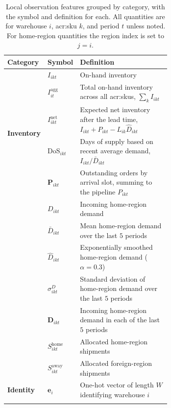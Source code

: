 \begin{table}[tbp]
\centering
\small
\setlength{\tabcolsep}{6pt}
\renewcommand{\arraystretch}{1.3}
\caption{Local observation features grouped by category, with the symbol and definition
for each. All quantities are for warehouse $i$, \gls{acr:sku} $k$, and period $t$ unless
noted. For home-region quantities the region index is set to $j=i$.}
\label{tab:obs-features}
\begin{tabular}{@{}l l >{\raggedright\arraybackslash}m{0.66\linewidth}@{}}
\toprule
\textbf{Category} & \textbf{Symbol} & \textbf{Definition}\\
\midrule
\multirow{5}{*}{\textbf{Inventory}}
 & $I_{ikt}$ & On-hand inventory\\\addlinespace[1pt]
 & $I^{\mathrm{agg}}_{it}$ & Total on-hand inventory across all \glspl{acr:sku}, $\sum_{k} I_{ikt}$\\\addlinespace[1pt]
 & $I^{\mathrm{net}}_{ikt}$ & Expected net inventory after the lead time, $I_{ikt}+P_{ikt}-L_{ik}\hat{D}_{ikt}$\\\addlinespace[1pt]
 & $\mathrm{DoS}_{ikt}$ & Days of supply based on recent average demand, $I_{ikt}/\bar{D}_{ikt}$\\\addlinespace[1pt]
 & $\mathbf{P}_{ikt}$ & Outstanding orders by arrival slot, summing to the pipeline $P_{ikt}$\\\addlinespace[1pt]
\midrule
\multirow{5}{*}{\textbf{Demand}}
 & $D_{ikt}$ & Incoming home-region demand\\\addlinespace[1pt]
 & $\bar{D}_{ikt}$ & Mean home-region demand over the last $5$ periods\\\addlinespace[1pt]
 & $\hat{D}_{ikt}$ & Exponentially smoothed home-region demand ($\alpha=0.3$)\\\addlinespace[1pt]
 & $\sigma^{D}_{ikt}$ & Standard deviation of home-region demand over the last $5$ periods\\\addlinespace[1pt]
 & $\mathbf{D}_{ikt}$ & Incoming home-region demand in each of the last $5$ periods\\\addlinespace[1pt]
\midrule
\multirow{2}{*}{\textbf{Fulfillment}}
 & $S^{\mathrm{home}}_{ikt}$ & Allocated home-region shipments\\\addlinespace[1pt]
 & $S^{\mathrm{away}}_{ikt}$ & Allocated foreign-region shipments\\\addlinespace[1pt]
\midrule
\textbf{Identity}
 & $\mathbf{e}_{i}$ & One-hot vector of length $W$ identifying warehouse $i$\\\addlinespace[1pt]
\bottomrule
\end{tabular}
\end{table}

